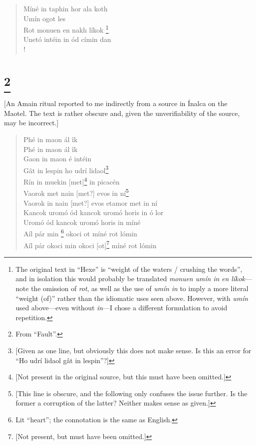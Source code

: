 \documentclass{article}
\let\oldthefootnote\thefootnote
\newcommand\oocfootnote[2][DarkGreen]{\renewcommand\thefootnote{\color{#1}\oldthefootnote}%
  \footnote{\color{#1}#2}%
  \renewcommand{\thefootnote}{\oldthefootnote}}
\begin{document}
\begin{verse}
Míné in taphin hor ala koth \\
Umín ogot les \\
Rot monuen en nakh líkok\oocfootnote{The original text in ``Hexe'' is ``weight of the waters / crushing the words'', and in isolation this would probably be translated \emph{monuen umín in en líkok}—note the omission of \emph{rot}, as well as the use of \emph{umín in} to imply a more literal ``weight (of)'' rather than the idiomatic uses seen above. However, with \emph{umín} used above—even without \emph{in}—I chose a different formulation to avoid repetition.} \\
Unetó intéin in ód címin dan \\!

\end{verse}

\section{\oocfootnote{From ``Fault''.}}

[An Amain ritual reported to me indirectly from a source in Ínalca on the Maotel. The text is rather obscure and, given the unverifiability of the source, may be incorrect.]


\begin{verse}
Phé in maon ál îk \\
Phé in maon ál îk \\
Gaon in maon é intéin \\
Gât in lespin ho udrí lidaol\footnote{[Given as one line, but obviously this does not make sense. Is this an error for ``Ho udrí lidaol gât in lespin''?]} \\
Rín in muekin [met]\footnote{[Not present in the original source, but this must have been omitted.]} in picacén \\
Vaorok met nain [met?] evos in ní\footnote{[This line is obscure, and the following only confuses the issue further. Is the former a corruption of the latter? Neither makes sense as given.]} \\
Vaorok in nain [met?] evos etamor met in ní \\
Kancok uromó ód kancok uromó horis in ó lor \\
Uromó ód kancok uromó horis in míné \\
Aíl pár min\oocfootnote{Lit ``heart''; the connotation is the same as English.} okoci ot míné rot lómin \\
Aíl pár okoci min okoci [ot]\footnote{[Not present, but must have been omitted.]} míné rot lómin \\

\end{verse}
\end{document}
